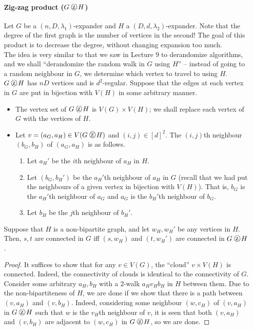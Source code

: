 			\paragraph{Zig-zag product ($G \zigzag H$)} Let $G$ be a $(n,D,\lambda_1)$-expander and $H$ a $(D,d,\lambda_2)$-expander. Note that the degree of the first graph is the number of vertices in the second! The goal of this product is to decrease the degree, without changing expansion too much. \\
			The idea is very similar to that we saw in Lecture 9 to derandomize algorithms, and we shall ``derandomize the random walk in $G$ using $H$'' -- instead of going to a random neighbour in $G$, we determine which vertex to travel to using $H$.\\
			$G \zigzag H$ has $nD$ vertices and is $d^2$-regular. Suppose that the edges at each vertex in $G$ are put in bijection with $V(H)$ in some arbitrary manner.
			\begin{itemize}
				\item The vertex set of $G\zigzag H$ is $V(G) \times V(H)$; we shall replace each vertex of $G$ with the vertices of $H$.
				\item Let $v = (a_G,a_H) \in V(G\zigzag H)$ and $(i,j) \in [d]^2$. The $(i,j)$th neighbour $(b_G,b_H)$ of $(a_G,a_H)$ is as follows.
				\begin{enumerate}
					\item Let $a_H'$ be the $i$th neighbour of $a_H$ in $H$.
					\item Let $(b_G,b_H')$ be the $a_H'$th neighbour of $a_H$ in $G$ (recall that we had put the neighbours of a given vertex in bijection with $V(H)$). That is, $b_G$ is the $a_H'$th neighbour of $a_G$ and $a_G$ is the $b_H'$th neighbour of $b_G$.
					\item Let $b_H$ be the $j$th neighbour of $b_H'$.
				\end{enumerate}
			\end{itemize}

			\begin{lemma}
				Suppose that $H$ is a non-bipartite graph, and let $w_H,w_H'$ be any vertices in $H$. Then, $s,t$ are connected in $G$ iff $(s,w_H)$ and $(t,w_H')$ are connected in $G \zigzag H$.
			\end{lemma}
			\begin{proof}
				It suffices to show that for any $v \in V(G)$, the ``cloud'' $v \times V(H)$ is connected. Indeed, the connectivity of clouds is identical to the connectivity of $G$. Consider some arbitrary $a_H,b_H$ with a $2$-walk $a_Hv_Hb_H$ in $H$ between them. Due to the non-bipartiteness of $H$, we are done if we show that there is a path between $(v,a_H)$ and $(v,b_H)$. Indeed, considering some neighbour $(w,c_H)$ of $(v,a_H)$ in $G\zigzag H$ such that $w$ is the $v_H$th neighbour of $v$, it is seen that both $(v,a_H)$ and $(v,b_H)$ are adjacent to $(w,c_H)$ in $G \zigzag H$, so we are done.
			\end{proof}

